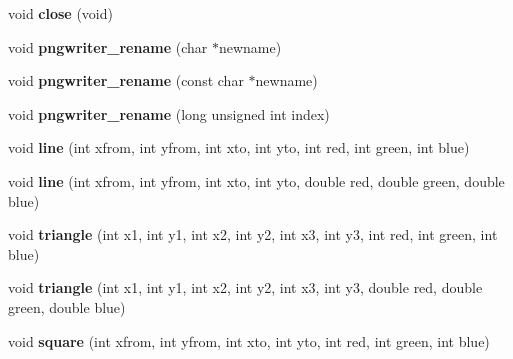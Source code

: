 \begin{DoxyCompactItemize}
\item 
\hypertarget{classpngwriter_a5f38cbb2456ce4bd79a8f9ef2581727b}{}void {\bfseries close} (void)\label{classpngwriter_a5f38cbb2456ce4bd79a8f9ef2581727b}

\item 
\hypertarget{classpngwriter_ab49c0874ec3f552d40bdae25eba2a5f6}{}void {\bfseries pngwriter\+\_\+rename} (char $\ast$newname)\label{classpngwriter_ab49c0874ec3f552d40bdae25eba2a5f6}

\item 
\hypertarget{classpngwriter_a0726bb3e346b1a6d643e7d88986fb89a}{}void {\bfseries pngwriter\+\_\+rename} (const char $\ast$newname)\label{classpngwriter_a0726bb3e346b1a6d643e7d88986fb89a}

\item 
\hypertarget{classpngwriter_a22334ab5922e7ad50bdcb055d0c9f6c9}{}void {\bfseries pngwriter\+\_\+rename} (long unsigned int index)\label{classpngwriter_a22334ab5922e7ad50bdcb055d0c9f6c9}

\item 
\hypertarget{classpngwriter_aaf92195b62192d815f0dae7ab37e49f4}{}void {\bfseries line} (int xfrom, int yfrom, int xto, int yto, int red, int green, int blue)\label{classpngwriter_aaf92195b62192d815f0dae7ab37e49f4}

\item 
\hypertarget{classpngwriter_a3aa71410032799f567fc9db3f28bb935}{}void {\bfseries line} (int xfrom, int yfrom, int xto, int yto, double red, double green, double blue)\label{classpngwriter_a3aa71410032799f567fc9db3f28bb935}

\item 
\hypertarget{classpngwriter_a049eb6da324678fee55348d21bea7872}{}void {\bfseries triangle} (int x1, int y1, int x2, int y2, int x3, int y3, int red, int green, int blue)\label{classpngwriter_a049eb6da324678fee55348d21bea7872}

\item 
\hypertarget{classpngwriter_a01aa7d56d5a7e6409528c17e3197b957}{}void {\bfseries triangle} (int x1, int y1, int x2, int y2, int x3, int y3, double red, double green, double blue)\label{classpngwriter_a01aa7d56d5a7e6409528c17e3197b957}

\item 
\hypertarget{classpngwriter_a29bba5e3fcd6e62c63d84f81a1a8df7f}{}void {\bfseries square} (int xfrom, int yfrom, int xto, int yto, int red, int green, int blue)\label{classpngwriter_a29bba5e3fcd6e62c63d84f81a1a8df7f}


\end{DoxyCompactItemize}
